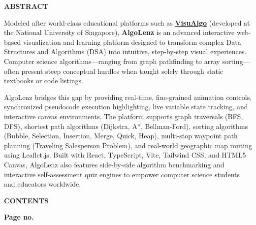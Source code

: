 \documentclass[12pt, a4paper]{article}
\begin{document}
\newpage

\setcounter{page}{1}

\begin{center}
    {\Large \textbf{ABSTRACT}}
\end{center}
\vspace{0.5cm}

Modeled after world-class educational platforms such as \href{https://visualgo.net/}{\textbf{VisuAlgo}} (developed at the National University of Singapore), \textbf{AlgoLenz} is an advanced interactive web-based visualization and learning platform designed to transform complex Data Structures and Algorithms (DSA) into intuitive, step-by-step visual experiences. Computer science algorithms—ranging from graph pathfinding to array sorting—often present steep conceptual hurdles when taught solely through static textbooks or code listings.

AlgoLenz bridges this gap by providing real-time, fine-grained animation controls, synchronized pseudocode execution highlighting, live variable state tracking, and interactive canvas environments. The platform supports graph traversals (BFS, DFS), shortest path algorithms (Dijkstra, A*, Bellman-Ford), sorting algorithms (Bubble, Selection, Insertion, Merge, Quick, Heap), multi-stop waypoint path planning (Traveling Salesperson Problem), and real-world geographic map routing using Leaflet.js. Built with React, TypeScript, Vite, Tailwind CSS, and HTML5 Canvas, AlgoLenz also features side-by-side algorithm benchmarking and interactive self-assessment quiz engines to empower computer science students and educators worldwide.

\newpage

\setcounter{page}{2}

\begin{center}
    {\Large \textbf{CONTENTS}}
\end{center}
\vspace{0.2cm}

\begin{flushright}
    \textbf{Page no.}
\end{flushright}
\end{document}

